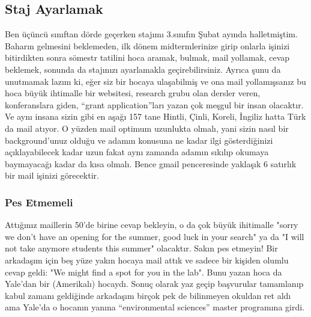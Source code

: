 \documentclass[12pt]{article}
\begin{document}
\subsection{Staj Ayarlamak}
Ben üçüncü sınıftan dörde geçerken stajımı 3.sınıfın Şubat ayında halletmiştim. Baharın gelmesini beklemeden, ilk dönem midtermlerinize girip onlarla işinizi bitirdikten sonra sömestr tatilini hoca aramak, bulmak, mail yollamak, cevap beklemek, sonunda da stajınızı ayarlamakla geçirebilirsiniz. Ayrıca şunu da unutmamak lazım ki, eğer siz bir hocaya ulaşabilmiş ve ona mail yollamışsanız bu hoca büyük ihtimalle bir websitesi, research grubu olan dersler veren, konferanslara giden, “grant application”ları yazan çok meşgul bir insan olacaktır. Ve aynı insana sizin gibi en aşağı 157 tane Hintli, Çinli, Koreli, İngiliz hatta Türk da mail atıyor. O yüzden mail optimum uzunlukta olmalı, yani sizin nasıl bir background’unuz olduğu ve adamın konusuna ne kadar ilgi gösterdiğinizi açıklayabilecek kadar uzun fakat aynı zamanda adamın sıkılıp okumaya baymayacağı kadar da kısa olmalı. Bence gmail penceresinde yaklaşık 6 satırlık bir mail işinizi görecektir.

\subsubsection{Pes Etmemeli}
Attığınız maillerin 50'de birine cevap bekleyin, o da çok büyük ihitimalle "sorry we don't have an opening for the summer, good luck in your search" ya da "I will not take anymore students  this summer" olacaktır. Sakın pes etmeyin! Bir arkadaşım için beş yüze yakın hocaya mail attık ve sadece bir kişiden olumlu cevap geldi: "We might find a spot for you in the lab". Bunu yazan hoca da Yale'dan bir (Amerikalı) hocaydı. Sonuç olarak yaz geçip başvurular tamamlanıp kabul zamanı geldiğinde arkadaşım birçok pek de bilinmeyen okuldan ret aldı ama Yale'da o hocanın yanına “environmental sciences” master programına girdi.
\end{document}
